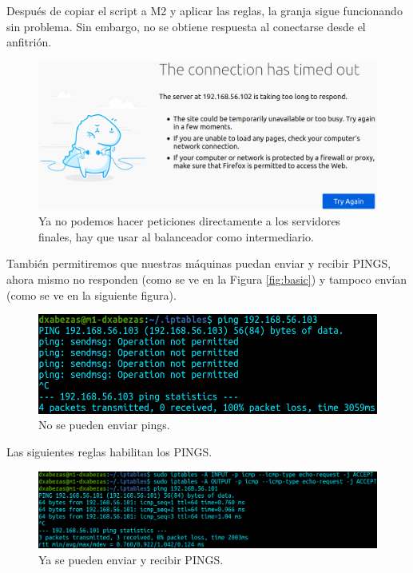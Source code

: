 \documentclass{article}
\begin{document}
Después de copiar el script a M2 y aplicar las reglas, la granja sigue funcionando sin problema. Sin embargo, no se obtiene
respuesta al conectarse desde el anfitrión.

\begin{figure}[H]
	\centering
	\includegraphics[width=140mm]{imgs/timed-out}
	\caption{Ya no podemos hacer peticiones directamente a los servidores finales, hay que usar al balanceador
		como intermediario.}
	\label{fig:timed-out}
\end{figure}

También permitiremos que nuestras máquinas puedan enviar y recibir PINGS, ahora mismo no responden (como se ve
en la Figura \ref{fig:basic}) y tampoco envían (como se ve en la siguiente figura).

\begin{figure}[H]
	\centering
	\includegraphics[width=140mm]{imgs/no-ping}
	\caption{No se pueden enviar pings.}
	\label{fig:no-ping}
\end{figure}

Las siguientes reglas habilitan los PINGS.

\begin{figure}[H]
	\centering
	\includegraphics[width=160mm]{imgs/ping}
	\caption{Ya se pueden enviar y recibir PINGS.}
	\label{fig:ping}
\end{figure}
\end{document}
